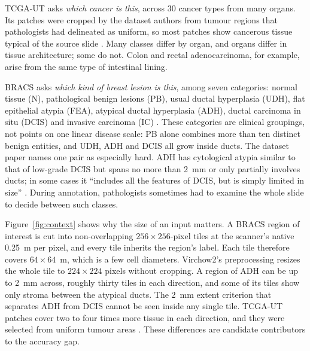 \documentclass[11pt]{article}
\begin{document}
TCGA-UT asks \emph{which cancer is this}, across 30 cancer types from many organs. Its patches were cropped by the dataset authors from tumour regions that pathologists had delineated as uniform, so most patches show cancerous tissue typical of the source slide \citep{komura2022universalEncoding}. Many classes differ by organ, and organs differ in tissue architecture; some do not. Colon and rectal adenocarcinoma, for example, arise from the same type of intestinal lining.

BRACS asks \emph{which kind of breast lesion is this}, among seven categories: normal tissue (N), pathological benign lesions (PB), usual ductal hyperplasia (UDH), flat epithelial atypia (FEA), atypical ductal hyperplasia (ADH), ductal carcinoma in situ (DCIS) and invasive carcinoma (IC) \citep{brancati2022bracs}. These categories are clinical groupings, not points on one linear disease scale: PB alone combines more than ten distinct benign entities, and UDH, ADH and DCIS all grow inside ducts. The dataset paper names one pair as especially hard. ADH has cytological atypia similar to that of low-grade DCIS but spans no more than 2~mm or only partially involves ducts; in some cases it ``includes all the features of DCIS, but is simply limited in size'' \citep{brancati2022bracs}. During annotation, pathologists sometimes had to examine the whole slide to decide between such classes.

Figure~\ref{fig:context} shows why the size of an input matters. A BRACS region of interest is cut into non-overlapping $256\times256$-pixel tiles at the scanner's native 0.25~\textmu m per pixel, and every tile inherits the region's label. Each tile therefore covers $64\times64$~\textmu m, which is a few cell diameters. Virchow2's preprocessing resizes the whole tile to $224\times224$ pixels without cropping. A region of ADH can be up to 2~mm across, roughly thirty tiles in each direction, and some of its tiles show only stroma between the atypical ducts. The 2~mm extent criterion that separates ADH from DCIS cannot be seen inside any single tile. TCGA-UT patches cover two to four times more tissue in each direction, and they were selected from uniform tumour areas \citep{komura2022universalEncoding}. These differences are candidate contributors to the accuracy gap.
\end{document}
